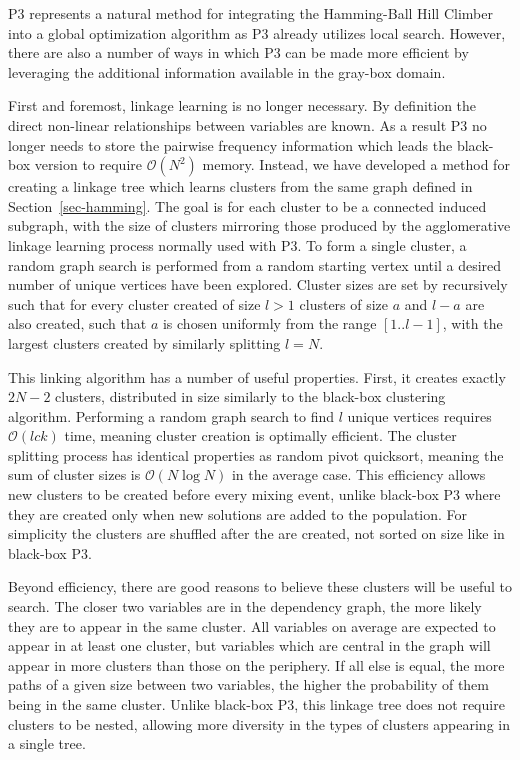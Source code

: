 \documentclass{sig-alternate}
\newcommand{\BigO}[1]{$\mathcal{O}{(#1)}$}
\begin{document}
P3 represents a natural method for integrating the Hamming-Ball Hill Climber into
a global optimization algorithm as P3 already utilizes local search. However, there
are also a number of ways in which P3 can be made more efficient by leveraging the
additional information available in the gray-box domain.

First and foremost, linkage learning is no longer necessary. By definition
the direct non-linear relationships between variables are known. As a result
P3 no longer needs to store the pairwise frequency information which leads
the black-box version to require \BigO{N^2} memory. Instead,
we have developed a method for creating a linkage tree which learns clusters
from the same graph defined in Section~\ref{sec-hamming}. The goal is for each
cluster to be a connected induced subgraph, with the size of clusters
mirroring those produced by the agglomerative linkage learning process normally
used with P3. To form a single cluster, a random graph search is performed from
a random starting vertex until a desired number of unique vertices have been explored.
Cluster sizes are set by recursively such that for every cluster created of size $l>1$
clusters of size $a$ and $l-a$ are also created, such that $a$ is chosen uniformly
from the range $[1..l-1]$, with the largest clusters created by similarly splitting $l=N$.

This linking algorithm has a number of useful properties. First, it creates exactly
$2N-2$ clusters, distributed in size similarly to the black-box clustering algorithm.
Performing a random graph search to find $l$ unique vertices requires \BigO{lck} time,
meaning cluster creation is optimally efficient.
The cluster splitting process has identical properties as random pivot quicksort,
meaning the sum of cluster sizes is \BigO{N\log N} in the average case.
This efficiency allows new clusters to be created before every mixing event,
unlike black-box P3 where they are created only when new solutions are added to the population.
For simplicity the clusters are shuffled after the are created, not sorted on size like in
black-box P3.

Beyond efficiency, there are good reasons to believe these clusters will be useful
to search. The closer two variables are in the dependency graph, the more likely
they are to appear in the same cluster. All variables on average are expected to appear
in at least one cluster, but variables which are central in the graph will appear in more
clusters than those on the periphery. If all else is equal, the more paths of a given
size between two variables, the higher the probability of them being in the same cluster.
Unlike black-box P3, this linkage tree does not require clusters to be nested, allowing
more diversity in the types of clusters appearing in a single tree.
\end{document}
